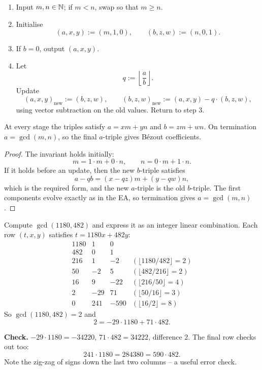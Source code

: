 \documentclass[11pt]{article}
\begin{document}
\begin{definition}
\begin{enumerate}
\item Input $m,n\in\mathbb{N}$; if $m<n$, swap so that $m\ge n$.
\item Initialise
\[
(a,x,y):=(m,1,0), \qquad (b,z,w):=(n,0,1).
\]
\item If $b=0$, output $(a,x,y)$.
\item Let
\[
q:=\left\lfloor\frac ab\right\rfloor.
\]
Update
\[
(a,x,y)_{\text{new}}:=(b,z,w), \qquad (b,z,w)_{\text{new}}:=(a,x,y)-q\cdot(b,z,w),
\]
using vector subtraction on the old values. Return to step 3.
\end{enumerate}
\end{definition}

\begin{theorem}
\label{thm:eea}
At every stage the triples satisfy $a=xm+yn$ and $b=zm+wn$. On termination $a=\gcd(m,n)$, so the final $a$-triple gives Bézout coefficients.
\end{theorem}

\begin{proof}
The invariant holds initially:
\[
m=1\cdot m+0\cdot n, \qquad n=0\cdot m+1\cdot n.
\]
If it holds before an update, then the new $b$-triple satisfies
\[
a-qb = (x-qz)m+(y-qw)n,
\]
which is the required form, and the new $a$-triple is the old $b$-triple. The first components evolve exactly as in the EA, so termination gives $a=\gcd(m,n)$.
\end{proof}

\begin{example}
Compute $\gcd(1180,482)$ and express it as an integer linear combination. Each row $(t,x,y)$ satisfies $t=1180x+482y$:
\[
\begin{array}{rrrl}
1180 & 1 & 0 & \\
482 & 0 & 1 & \\
216 & 1 & -2 & (\lfloor1180/482\rfloor=2)\\
50 & -2 & 5 & (\lfloor482/216\rfloor=2)\\
16 & 9 & -22 & (\lfloor216/50\rfloor=4)\\
2 & -29 & 71 & (\lfloor50/16\rfloor=3)\\
0 & 241 & -590 & (\lfloor16/2\rfloor=8)
\end{array}
\]
So $\gcd(1180,482)=2$ and
\[
2 = -29\cdot1180 + 71\cdot482.
\]

\smallskip
\noindent\textbf{Check.} $-29\cdot1180=-34220$, $71\cdot482=34222$, difference $2$. The final row checks out too:
\[
241\cdot1180=284380=590\cdot482.
\]
Note the zig-zag of signs down the last two columns -- a useful error check.
\end{example}
\end{document}
